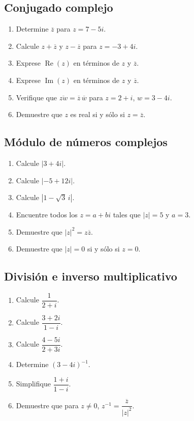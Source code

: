 \subsection{Conjugado complejo}
\begin{enumerate}
\item Determine $\overline z$ para $z=7-5i$.
\item Calcule $z+\overline z$ y $z-\overline z$ para $z=-3+4i$.
\item Exprese $\operatorname{Re}(z)$ en términos de $z$ y $\overline z$.
\item Exprese $\operatorname{Im}(z)$ en términos de $z$ y $\overline z$.
\item Verifique que $\overline{zw}=\overline z\,\overline w$ para $z=2+i$, $w=3-4i$.
\item Demuestre que $z$ es real si y sólo si $z=\overline z$.
\end{enumerate}

\subsection{Módulo de números complejos}
\begin{enumerate}
\item Calcule $|3+4i|$.
\item Calcule $|-5+12i|$.
\item Calcule $|1-\sqrt3\,i|$.
\item Encuentre todos los $z=a+bi$ tales que $|z|=5$ y $a=3$.
\item Demuestre que $|z|^2=z\overline z$.
\item Demuestre que $|z|=0$ si y sólo si $z=0$.
\end{enumerate}

\subsection{División e inverso multiplicativo}
\begin{enumerate}
\item Calcule $\dfrac{1}{2+i}$.
\item Calcule $\dfrac{3+2i}{1-i}$.
\item Calcule $\dfrac{4-5i}{2+3i}$.
\item Determine $(3-4i)^{-1}$.
\item Simplifique $\dfrac{1+i}{1-i}$.
\item Demuestre que para $z\neq0$, $z^{-1}=\dfrac{\overline z}{|z|^2}$.
\end{enumerate}

